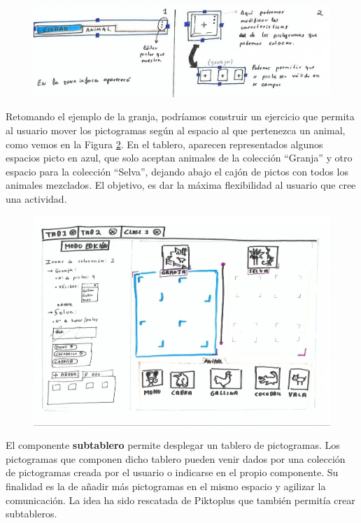 \begin{figure}[h!]
	\centering
	\includegraphics[width=0.7\linewidth]{Imagenes/Bitmap/componenteCajon}
	\caption{}
	\label{fig:componentecajon}
\end{figure}




Retomando el ejemplo de la granja, podríamos construir un ejercicio que permita al usuario mover los pictogramas según al espacio al que pertenezca un animal, como vemos en la Figura \ref{fig:cajonpictosgranja}. En el tablero, aparecen representados algunos espacios picto en azul, que solo aceptan animales de la colección “Granja” y otro espacio para la colección “Selva”, dejando abajo el cajón de pictos con todos los animales mezclados. El objetivo, es dar la máxima flexibilidad al usuario que cree una actividad.

\begin{figure}[h!]
	\centering
	\includegraphics[width=0.7\linewidth]{Imagenes/Bitmap/cajonPictosGranja}
	\caption{}
	\label{fig:cajonpictosgranja}
\end{figure}

El componente \textbf{subtablero} permite desplegar un tablero de pictogramas. Los pictogramas que componen dicho tablero pueden venir dados por una colección de pictogramas creada por el usuario o indicarse en el propio componente. Su finalidad es la de añadir más pictogramas en el mismo espacio y agilizar la comunicación. La idea ha sido rescatada de Piktoplus que también permitía crear subtableros.


